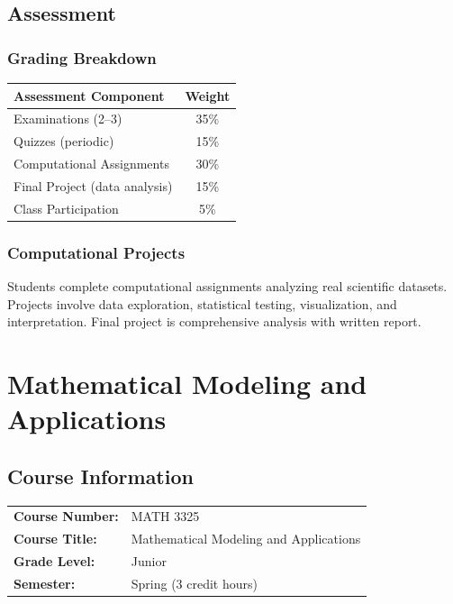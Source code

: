\documentclass[12pt,oneside]{book}
\begin{document}
\section{Assessment}

\subsection{Grading Breakdown}

\begin{table}[h]
\centering
\begin{tabular}{lc}
\toprule
\textbf{Assessment Component} & \textbf{Weight} \\
\midrule
Examinations (2--3) & 35\% \\
Quizzes (periodic) & 15\% \\
Computational Assignments & 30\% \\
Final Project (data analysis) & 15\% \\
Class Participation & 5\% \\
\bottomrule
\end{tabular}
\end{table}

\subsection{Computational Projects}

Students complete computational assignments analyzing real scientific datasets. Projects involve data exploration, statistical testing, visualization, and interpretation. Final project is comprehensive analysis with written report.


\chapter{Mathematical Modeling and Applications}

\section{Course Information}

\begin{tabular}{ll}
\textbf{Course Number:} & MATH 3325 \\
\textbf{Course Title:} & Mathematical Modeling and Applications \\
\textbf{Grade Level:} & Junior \\
\textbf{Semester:} & Spring (3 credit hours) \\
\end{tabular}
\end{document}
